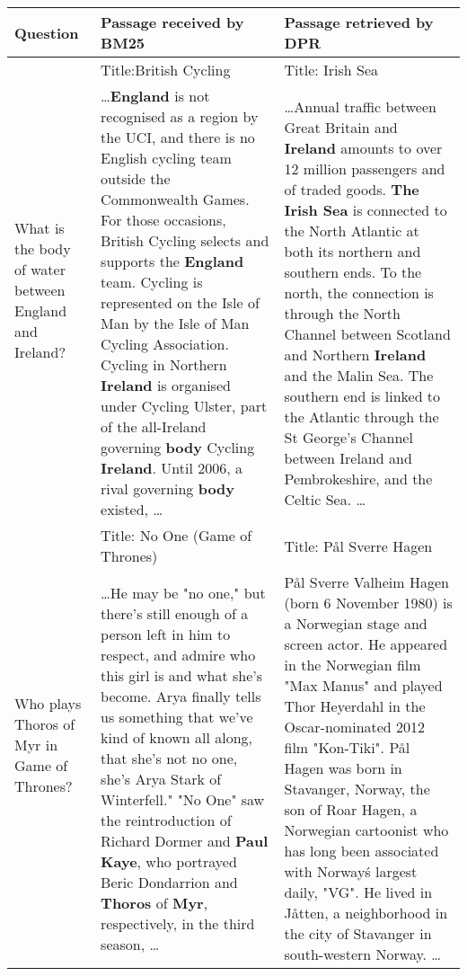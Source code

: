 \documentclass[11pt,a4paper]{article}
\def\model/{DPR}
\newcommand\tf[1]{\textbf{#1}}
\begin{document}
\begin{table*}[!t]
\scriptsize
\begin{tabular}{p{3cm}|p{6cm}|p{6cm}}
\toprule
\tf{Question} & \tf{Passage received by BM25} & \tf{Passage retrieved by \model/} \\
\midrule
\multirow{2}{3cm}{What is the body of water between England and Ireland?} & Title:British Cycling  & Title: Irish Sea\\
& \ldots  \tf{England} is not recognised as a region by the UCI, and there is no English cycling team outside the Commonwealth Games. For those occasions, British Cycling selects and supports the \tf{England} team. Cycling is represented on the Isle of Man by the Isle of Man Cycling Association.  Cycling in Northern \tf{Ireland} is organised under Cycling Ulster, part of the all-Ireland governing \tf{body} Cycling \tf{Ireland}. Until 2006, a rival governing \tf{body} existed,  \ldots & \ldots Annual traffic between Great Britain and \tf{Ireland} amounts to over 12 million passengers and of traded goods. {\color{blue}\tf{The Irish Sea}} is connected to the North Atlantic at both its northern and southern ends. To the north, the connection is through the North Channel between Scotland and Northern \tf{Ireland} and the Malin Sea. The southern end is linked to the Atlantic through the St George's Channel between Ireland and Pembrokeshire, and the Celtic Sea. \ldots \\
\midrule
\multirow{2}{3cm}{Who plays Thoros of Myr in Game of Thrones?} & Title: No One (Game of Thrones) & Title:
P\r{a}l Sverre Hagen \\ & \ldots He may be "no one," but there's still enough of a person left in him to respect, and admire who this girl is and what she's become. Arya finally tells us something that we've kind of known all along, that she's not no one, she's Arya Stark of Winterfell." "No One" saw the reintroduction of Richard Dormer and {\color{blue}\tf{Paul Kaye}}, who portrayed Beric Dondarrion and \tf{Thoros} of \tf{Myr}, respectively, in the third season, \ldots &
P\r{a}l Sverre Valheim Hagen (born 6 November 1980) is a Norwegian stage and screen actor. He appeared in the Norwegian film "Max Manus" and played Thor Heyerdahl in the Oscar-nominated 2012 film "Kon-Tiki". Pål Hagen was born in Stavanger, Norway, the son of Roar Hagen, a Norwegian cartoonist who has long been associated with Norway\'s largest daily, "VG". He lived in Jåtten, a neighborhood in the city of Stavanger in south-western Norway. \ldots \\
\bottomrule
\end{tabular}
\caption{Examples of passages returned from BM25 and \model/. Correct answers are written in {\color{blue} \tf{blue}} and the content words in the question are written in bold.}
\label{tab:retrieved-examples}
\end{table*}
\end{document}
